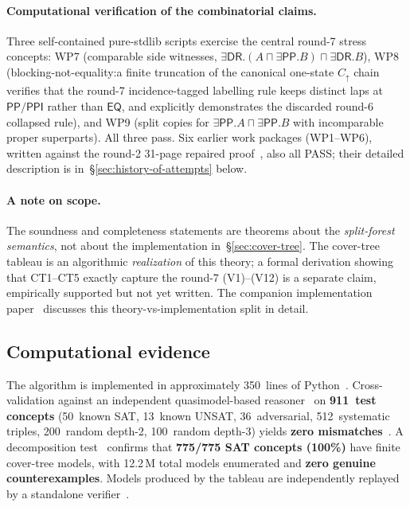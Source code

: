 \documentclass[
]{ceurart}
\theoremstyle{definition}
\newcommand{\DR}{\ensuremath{\mathsf{DR}}}
\newcommand{\EQ}{\ensuremath{\mathsf{EQ}}}
\newcommand{\PP}{\ensuremath{\mathsf{PP}}}
\newcommand{\PPI}{\ensuremath{\mathsf{PPI}}}
\begin{document}
\paragraph{Computational verification of the combinatorial
claims.}  Three self-contained pure-stdlib scripts exercise the
central round-7 stress concepts: WP7 (comparable side witnesses,
$\exists\DR.(A\sqcap\exists\PP.B)\sqcap\exists\DR.B$), WP8
(blocking-not-equality:\@ a finite truncation of the canonical
one-state $C_\uparrow$ chain verifies that the round-7
incidence-tagged labelling rule keeps distinct laps at $\PP/\PPI$
rather than $\EQ$, and explicitly demonstrates the discarded
round-6 collapsed rule), and WP9 (split copies for
$\exists\PP.A\sqcap\exists\PP.B$ with incomparable proper
superparts).  All three pass.  Six earlier work packages (WP1--WP6),
written against the round-2 31-page repaired
proof~\cite{GPT55Repaired}, also all PASS; their detailed
description is in~\S\ref{sec:history-of-attempts} below.

\paragraph{A note on scope.}  The soundness and completeness
statements are theorems about the \emph{split-forest
semantics}, not about the implementation
in~\S\ref{sec:cover-tree}.  The cover-tree tableau is an
algorithmic \emph{realization} of this theory; a formal
derivation showing that CT1--CT5 exactly capture the round-7
(V1)--(V12) is a separate claim, empirically supported but not
yet written.  The companion implementation
paper~\cite{CoverTreeImpl} discusses this theory-vs-implementation
split in detail.

\subsection{Computational evidence}

The algorithm is implemented in approximately 350~lines of
Python~\cite{CoverTreeImpl,CoverTreeReasoner}.
Cross-validation against an independent quasimodel-based
reasoner~\cite{QuasimodelReasoner,CyclicReasoner} on
\textbf{911~test concepts} (50~known SAT,
13~known UNSAT, 36~adversarial, 512~systematic triples,
200~random depth-2, 100~random depth-3) yields
\textbf{zero mismatches}~\cite{StressTestCoverTree,StressTestCyclic,TestCyclicReasoner}.
A decomposition test~\cite{DecompositionTest} confirms that
\textbf{775/775 SAT concepts (100\%)} have finite cover-tree
models, with 12.2\,M total models enumerated and \textbf{zero
genuine counterexamples}. Models produced by the tableau are
independently replayed by a standalone verifier~\cite{ModelVerifier}.
\end{document}
